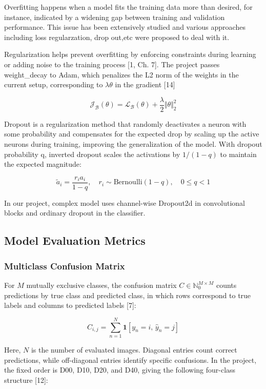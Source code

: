 Overfitting happens when a model fits the training data more than desired, for instance, indicated by a widening gap between training and validation performance. This issue has been extensively studied and various approaches including loss regularzation, drop out,etc were proposed to deal with it.

Regularization helps prevent overfitting by enforcing constraints during learning or adding noise to the training process [1, Ch. 7]. The project passes weight\_decay to Adam, which penalizes the L2 norm of the weights in the current setup, corresponding to \(\lambda \theta \) in the gradient [14]

\[
{\mathcal{J}}_{\mathcal{B}}(\theta )={\mathcal{L}}_{\mathcal{B}}(\theta )+\frac{\lambda }{2}\Vert \theta {\Vert }_{2}^{2}
\]

Dropout is a regularization method that randomly deactivates a neuron with some probability and compensates for the expected drop by scaling up the active neurons during training, improving the generalization of the model. With dropout probability q, inverted dropout scales the activations by \(1/(1-q)\) to maintain the expected magnitude:

\[
{\tilde{a}}_{i}=\frac{{r}_{i}{a}_{i}}{1-q},\quad {r}_{i}\sim \mathrm{Bernoulli}(1-q),\quad 0\le q<1
\]

In our project, complex model uses channel-wise Dropout2d in convolutional blocks and ordinary dropout in the classifier.

\subsection{Model Evaluation Metrics}\label{theory:2.4}

\subsubsection{Multiclass Confusion Matrix}\label{theory:2.4.1}

For \(M\) mutually exclusive classes, the confusion matrix \(C\in {\mathbb{N}}_{0}^{M\times M}\) counts predictions by true class and predicted class, in which rows correspond to true labels and columns to predicted labels [7]:

\[
{C}_{i,j}=\sum _{n=1}^{N} \boldsymbol{1}[{y}_{n}=i,\,{\hat{y}}_{n}=j]
\]

Here, \(N\) is the number of evaluated images. Diagonal entries count correct predictions, while off-diagonal entries identify specific confusions. In the project, the fixed order is D00, D10, D20, and D40, giving the following four-class structure [12]:

